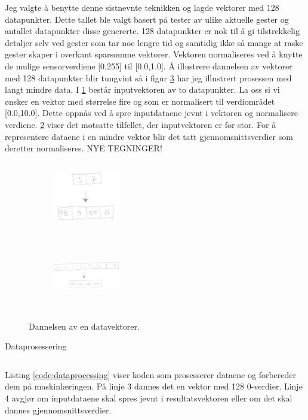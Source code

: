Jeg valgte å benytte denne sistnevnte teknikken og lagde vektorer med 128 datapunkter. Dette tallet ble valgt basert på tester av ulike aktuelle gester og antallet datapunkter disse genererte. 128 datapunkter er nok til å gi tilstrekkelig detaljer selv ved gester som tar noe lengre tid og samtidig ikke så mange at raske gester skaper i overkant sparsomme vektorer. Vektoren normaliseres ved å knytte de mulige sensorverdiene [0,255] til [0.0,1.0]. Å illustrere dannelsen av vektorer med 128 datapunkter blir tungvint så i figur \ref{fig:data} har jeg illustrert prosessen med langt mindre data. I \ref{fig:few} består inputvektoren av to datapunkter. La oss si vi ønsker en vektor med størrelse fire og som er normalisert til verdiområdet [0.0,10.0]. Dette oppnås ved å spre inputdataene jevnt i vektoren og normalisere verdiene. \ref{fig:many} viser det motsatte tilfellet, der inputvektoren er for stor. For å representere dataene i en mindre vektor blir det tatt gjennomsnittsverdier som deretter normaliseres. {\color{red}NYE TEGNINGER!}
\begin{figure}[h]
\centering
\begin{subfigure}{0.23\textwidth}
\includegraphics[width=3cm, height=3cm]{fig/few-to-many}
\caption{}
\label{fig:few}
\end{subfigure}
\begin{subfigure}{0.23\textwidth}
\includegraphics[width=3cm, height=3cm]{fig/many-to-few}
\caption{}
\label{fig:many}
\end{subfigure}
\caption{Dannelsen av en datavektorer.}
\label{fig:data}
\end{figure}
\begin{listing}[ht]
\caption{Dataprosessering}
\inputminted[fontsize=\footnotesize, linenos]{python}{kodesnutter/preprocess_data.py}
\label{code:dataprocessing}
\end{listing}
Listing \ref{code:dataprocessing} viser koden som prosesserer dataene og forbereder dem på maskinlæringen. På linje 3 dannes det en vektor med 128 0-verdier. Linje 4 avgjør om inputdataene skal spres jevnt i resultatsvektoren eller om det skal dannes gjennomsnittsverdier.

